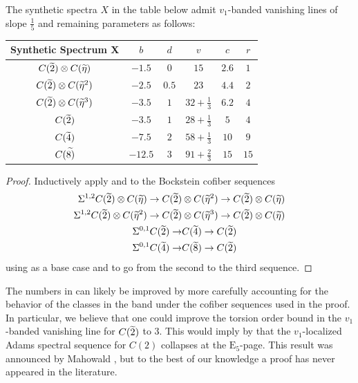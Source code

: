 \begin{prop}\label{prop:banded-numbers}
  The synthetic spectra $X$ in the table below admit $v_1$-banded vanishing lines of slope $\frac{1}{5}$ and remaining parameters as follows:
  \renewcommand{\arraystretch}{1.6}
  \begin{center}
    \begin{tabular}{|c||c|c|c|c|c|}
      \hline
      \textup{Synthetic Spectrum X} & $b$ & $d$ & $v$ & $c$ & $r$ \\ \hline \hline
      $C(\wt{2}) \otimes C(\wt{\eta})$ &
      $-1.5$ & $0$ & $15$ & $2.6$ & $1$ \\ \hline
      $C(\wt{2}) \otimes C(\wt{\eta}^2)$ &
      $-2.5$ & $0.5$ & $23$ & $4.4$ & $2$ \\ \hline
      $C(\wt{2}) \otimes C(\wt{\eta}^3)$ &
      $-3.5$ & $1$ & $32 + \frac{1}{3}$ & $6.2$ & $4$ \\ \hline
      $C(\wt{2})$ &
      $-3.5$ & $1$ & $28 + \frac{1}{3}$ & $5$ & $4$ \\ \hline
      $C(\wt{4})$ &
      $-7.5$ & $2$ & $58 + \frac{1}{3}$ & $10$ & $9$ \\ \hline
      $C(\wt{8)}$ &
      $-12.5$ & $3$ & $91 + \frac{2}{3}$ & $15$ & $15$ \\ \hline
    \end{tabular}
  \end{center}
  \renewcommand{\arraystretch}{1.0}
\end{prop}

\begin{proof}
  Inductively apply  and  to the Bockstein cofiber sequences
  \begin{align*}
      \Sigma^{1,2} C(\wt{2}) \otimes C(\wt{\eta}) \to C(\wt{2}) &\otimes C(\wt{\eta}^2) \to C(\wt{2}) \otimes C(\wt{\eta}) \\
      \Sigma^{1,2} C(\wt{2}) \otimes C(\wt{\eta}^2) \to C(\wt{2}) &\otimes C(\wt{\eta}^3) \to C(\wt{2}) \otimes C(\wt{\eta}) \\
      \Sigma^{0,1} C(\wt{2}) \to &C(\wt{4}) \to C(\wt{2}) \\
      \Sigma^{0,1} C(\wt{4}) \to &C(\wt{8}) \to C(\wt{2})
  \end{align*}
    using  as a base case and  to go from the second to the third sequence.
\end{proof}

\begin{rmk}
    The numbers in  can likely be improved by more carefully accounting for the behavior of the classes in the band under the cofiber sequences used in the proof. In particular, we believe that one could improve the torsion order bound in the $v_1$-banded vanishing line for $C(\wt{2})$ to $3$. This would imply by  that the $v_1$-localized Adams spectral sequence for $C(2)$ collapses at the $\mathrm{E}_5$-page. This result was announced by Mahowald \cite[Theorem 5]{MahBull}, but to the best of our knowledge a proof has never appeared in the literature.
\end{rmk}

